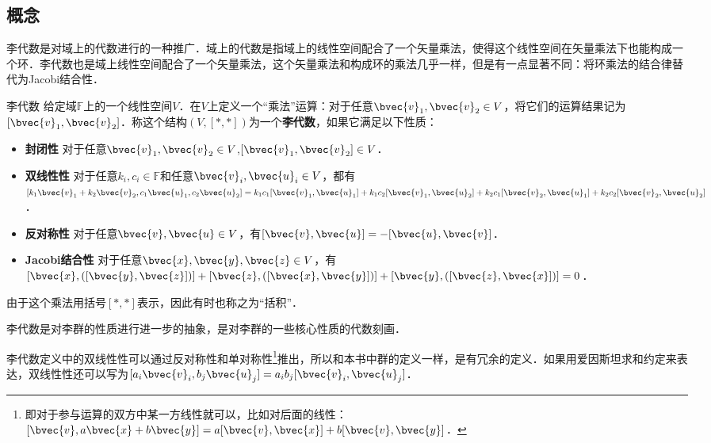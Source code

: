 
\subsection{概念}

李代数是对域上的代数进行的一种推广．域上的代数是指域上的线性空间配合了一个矢量乘法，使得这个线性空间在矢量乘法下也能构成一个环．李代数也是域上线性空间配合了一个矢量乘法，这个矢量乘法和构成环的乘法几乎一样，但是有一点显著不同：将环乘法的结合律替代为Jacobi结合性．

\begin{definition}{李代数}
给定域$\mathbb{F}$上的一个线性空间$V$．在$V$上定义一个“乘法”运算：对于任意$\bvec{v}_1, \bvec{v}_2\in V$，将它们的运算结果记为$[\bvec{v}_1, \bvec{v}_2]$．称这个结构$(V, [*, *])$为一个\textbf{李代数}，如果它满足以下性质：
\begin{itemize}
\item \textbf{封闭性} 对于任意$\bvec{v}_1, \bvec{v}_2\in V$,$[\bvec{v}_1, \bvec{v}_2]\in V$．
\item \textbf{双线性性} 对于任意$k_i, c_i\in \mathbb{F}$和任意$\bvec{v}_i, \bvec{u}_i\in V$，都有$[k_1\bvec{v}_1+k_2\bvec{v}_2, c_1\bvec{u}_1, c_2\bvec{u}_2]=k_1c_1[\bvec{v}_1, \bvec{u}_1]+k_1c_2[\bvec{v}_1, \bvec{u}_2]+k_2c_1[\bvec{v}_2, \bvec{u}_1]+k_2c_2[\bvec{v}_2, \bvec{u}_2]$．
\item \textbf{反对称性} 对于任意$\bvec{v}, \bvec{u}\in V$，有$[\bvec{v}, \bvec{u}]=-[\bvec{u}, \bvec{v}]$．
\item \textbf{Jacobi结合性} 对于任意$\bvec{x}, \bvec{y}, \bvec{z}\in V$，有$[\bvec{x}, ([\bvec{y}, \bvec{z}])]+[\bvec{z}, ([\bvec{x}, \bvec{y}])]+[\bvec{y}, ([\bvec{z}, \bvec{x}])]=0$．
\end{itemize}

由于这个乘法用括号$[*, *]$表示，因此有时也称之为“括积”．
\end{definition}

李代数是对李群的性质进行进一步的抽象，是对李群的一些核心性质的代数刻画．

李代数定义中的双线性性可以通过反对称性和单对称性\footnote{即对于参与运算的双方中某一方线性就可以，比如对后面的线性：$[\bvec{v},a\bvec{x}+b\bvec{y}]=a[\bvec{v}, \bvec{x}]+b[\bvec{v}, \bvec{y}]$．}推出，所以和本书中群的定义一样，是有冗余的定义．如果用爱因斯坦求和约定来表达，双线性性还可以写为$[a_i\bvec{v}_i, b_j\bvec{u}_j]=a_ib_j[\bvec{v}_i, \bvec{u}_j]$．


